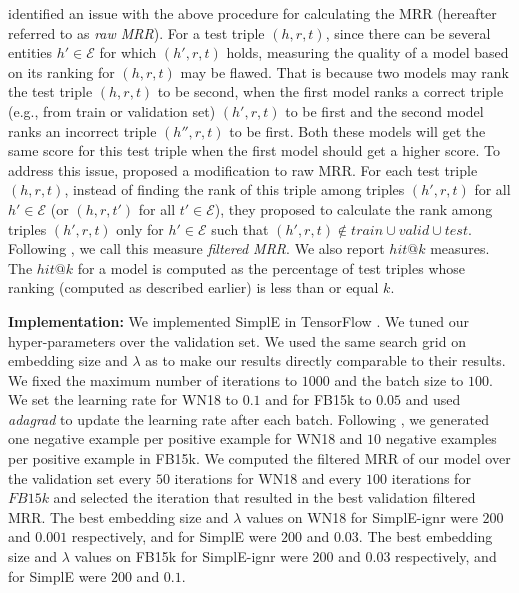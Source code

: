 \documentclass{article}
\newcommand{\entities}{\ensuremath{\mathcal{E}}}
\newcommand{\triple}[3]{(\mathit{#1}, \mathit{#2}, \mathit{#3})}
\begin{document}
\citet{bordes2013translating} identified an issue with the above procedure for calculating the MRR (hereafter referred to as \emph{raw MRR}). For a test triple $\triple{h}{r}{t}$, since there can be several entities $h' \in\entities$ for which $\triple{h'}{r}{t}$ holds, measuring the quality of a model based on its ranking for $\triple{h}{r}{t}$ may be flawed. That is because two models may rank the test triple $\triple{h}{r}{t}$ to be second, when the first model ranks a correct triple (e.g., from train or validation set) $\triple{h'}{r}{t}$ to be first and the second model ranks an incorrect triple $\triple{h''}{r}{t}$ to be first. Both these models will get the same score for this test triple when the first model should get a higher score.
To address this issue, \cite{bordes2013translating} proposed a modification to raw MRR. For each test triple $\triple{h}{r}{t}$, instead of finding the rank of this triple among triples $\triple{h'}{r}{t}$ for all $h'\in\entities$ (or $\triple{h}{r}{t'}$ for all $t' \in \entities$), they proposed to calculate the rank among triples $\triple{h'}{r}{t}$ only for $h'\in \entities$ such that $\triple{h'}{r}{t} \not\in train \cup valid \cup test$. Following \cite{bordes2013translating}, we call this measure \emph{filtered MRR}. 
We also report $hit@k$ measures. The $hit@k$ for a model is computed as the percentage of test triples whose ranking (computed as described earlier) is less than or equal $k$.

\textbf{Implementation:} We implemented SimplE in TensorFlow \cite{TensorFlow}. We tuned our hyper-parameters over the validation set. We used the same search grid on embedding size and $\lambda$ as \cite{trouillon2016complex} to make our results directly comparable to their results. We fixed the maximum number of iterations to $1000$ and the batch size to $100$. We set the learning rate for WN18 to $0.1$ and for FB15k to $0.05$ and used \emph{adagrad} to update the learning rate after each batch. Following \cite{trouillon2016complex}, we generated one negative example per positive example for WN18 and $10$ negative examples per positive example in FB15k. We computed the filtered MRR of our model over the validation set every $50$ iterations for WN18 and every $100$ iterations for $FB15k$ and selected the iteration that resulted in the best validation filtered MRR. The best embedding size and $\lambda$ values on WN18 for SimplE-ignr were $200$ and $0.001$ respectively, and for SimplE were $200$ and $0.03$. The best embedding size and $\lambda$ values on FB15k for SimplE-ignr were $200$ and $0.03$ respectively, and for SimplE were $200$ and $0.1$.
\end{document}
